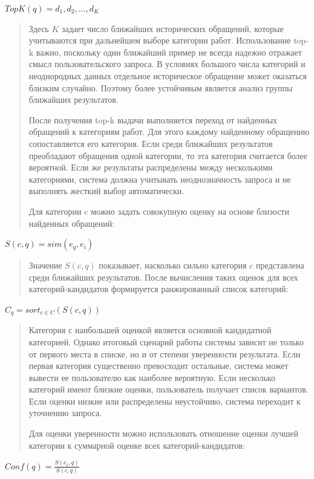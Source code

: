 \documentclass[
]{article}
\begin{document}
\(TopK(q) = d_{1},d_{2},...,d_{K}\)

\begin{quote}
Здесь \(K\) задает число ближайших исторических обращений, которые
учитываются при дальнейшем выборе категории работ. Использование top-k
важно, поскольку один ближайший пример не всегда надежно отражает смысл
пользовательского запроса. В условиях большого числа категорий и
неоднородных данных отдельное историческое обращение может оказаться
близким случайно. Поэтому более устойчивым является анализ группы
ближайших результатов.

После получения top-k выдачи выполняется переход от найденных обращений
к категориям работ. Для этого каждому найденному обращению
сопоставляется его категория. Если среди ближайших результатов
преобладают обращения одной категории, то эта категория считается более
вероятной. Если же результаты распределены между несколькими
категориями, система должна учитывать неоднозначность запроса и не
выполнять жесткий выбор автоматически.

Для категории c можно задать совокупную оценку на основе близости
найденных обращений:
\end{quote}

\(S(c,q) = sim\left( e_{q},e_{i} \right)\)

\begin{quote}
Значение \(S(c,q)\) показывает, насколько сильно категория c
представлена среди ближайших результатов. После вычисления таких оценок
для всех категорий-кандидатов формируется ранжированный список
категорий:
\end{quote}

\(C_{q} = sort_{c \in C}\left( S(c,q) \right)\)

\begin{quote}
Категория с наибольшей оценкой является основной кандидатной категорией.
Однако итоговый сценарий работы системы зависит не только от первого
места в списке, но и от степени уверенности результата. Если первая
категория существенно превосходит остальные, система может вывести ее
пользователю как наиболее вероятную. Если несколько категорий имеют
близкие оценки, пользователь получает список вариантов. Если оценки
низкие или распределены неустойчиво, система переходит к уточнению
запроса.

Для оценки уверенности можно использовать отношение оценки лучшей
категории к суммарной оценке всех категорий-кандидатов:
\end{quote}

\(Conf(q) = \frac{S\left( c_{1},q \right)}{S(c,q)}\)
\end{document}
